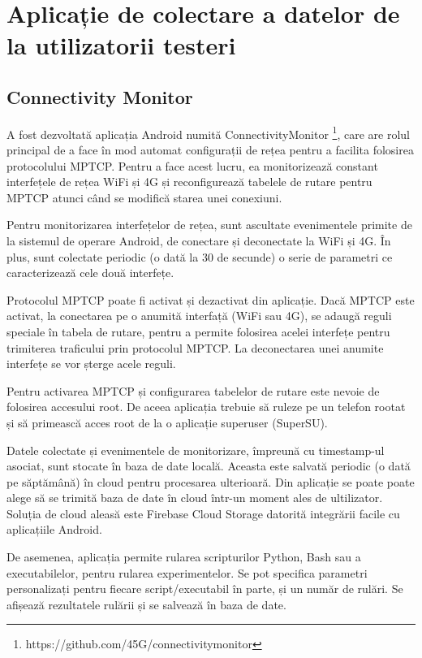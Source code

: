 \chapter{Aplicație de colectare a datelor de la utilizatorii testeri}

\section{Connectivity Monitor}

A fost dezvoltată aplicația Android numită ConnectivityMonitor \footnote{https://github.com/45G/connectivitymonitor}, care are rolul principal de a face în mod automat configurații de rețea pentru a facilita folosirea protocolului MPTCP. Pentru a face acest lucru, ea monitorizează constant interfețele de rețea WiFi și 4G și reconfigurează tabelele de rutare pentru MPTCP atunci când se modifică starea unei conexiuni.

Pentru monitorizarea interfețelor de rețea, sunt ascultate evenimentele primite de la sistemul de operare Android, de conectare și deconectate la WiFi și 4G. În plus, sunt colectate periodic (o dată la 30 de secunde) o serie de parametri ce caracterizează cele două interfețe.

Protocolul MPTCP poate fi activat și dezactivat din aplicație. Dacă MPTCP este activat, la conectarea pe o anumită interfață (WiFi sau 4G), se adaugă reguli speciale în tabela de rutare, pentru a permite folosirea acelei interfețe pentru trimiterea traficului prin protocolul MPTCP. La deconectarea unei anumite interfețe se vor șterge acele reguli.

Pentru activarea MPTCP și configurarea tabelelor de rutare este nevoie de folosirea accesului root. De aceea aplicația trebuie să ruleze pe un telefon rootat și să primească acces root de la o aplicație  superuser (SuperSU).

Datele colectate și evenimentele de monitorizare, împreună cu timestamp-ul asociat, sunt stocate în baza de date locală. Aceasta este salvată periodic (o dată pe săptămână) în cloud pentru procesarea ulterioară. Din aplicație se poate poate alege să se trimită baza de date în cloud într-un moment ales de ultilizator. Soluția de cloud aleasă este Firebase Cloud Storage datorită integrării facile cu aplicațiile Android.

De asemenea, aplicația permite rularea scripturilor Python, Bash sau a executabilelor, pentru rularea experimentelor. Se pot specifica parametri personalizați pentru fiecare script/executabil în parte, și un număr de rulări. Se afișează rezultatele rulării și se salvează în baza de date.

